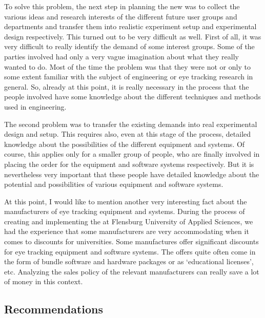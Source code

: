 \documentclass[output=paper]{langsci/langscibook}
\begin{document}
To solve this problem, the next step in planning the new  was to collect the various ideas and research interests of the different future user groups and departments and transfer them into realistic experiment setup and experimental design respectively. This turned out to be very difficult as well. First of all, it was very difficult to really identify the demand of some interest groups. Some of the parties involved had only a very vague imagination about what they really wanted to do. Most of the time the problem was that they were not or only to some extent familiar with the subject of  engineering or eye tracking research in general. So, already at this point, it is really necessary in the process that the people involved have some knowledge about the different techniques and methods used in  engineering. 



The second problem was to transfer the existing demands into real experimental design and setup. This requires also, even at this stage of the process, detailed knowledge about the possibilities of the different equipment and systems. Of course, this applies only for a smaller group of people, who are finally involved in placing the order for the equipment and software systems respectively. But it is nevertheless very important that these people have detailed knowledge about the potential and possibilities of various equipment and software systems. 



At this point, I would like to mention another very interesting fact about the manufacturers of eye tracking equipment and systems. During the process of creating and implementing the  at Flensburg University of Applied Sciences, we had the experience that some manufacturers are very accommodating when it comes to discounts for universities. Some manufactures offer significant discounts for eye tracking equipment and software systems. The offers quite often come in the form of bundle software and hardware packages or as `educational licenses', etc. Analyzing the sales policy of the relevant manufacturers can really save a lot of money in this context.


\subsection{Recommendations}
\end{document}
